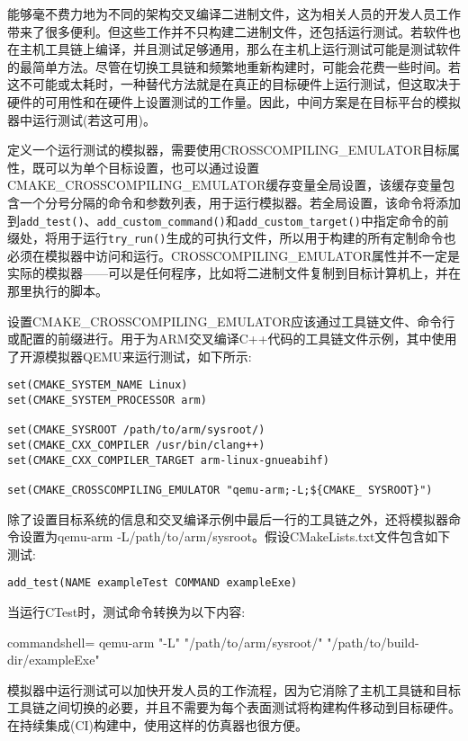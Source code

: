 
能够毫不费力地为不同的架构交叉编译二进制文件，这为相关人员的开发人员工作带来了很多便利。但这些工作并不只构建二进制文件，还包括运行测试。若软件也在主机工具链上编译，并且测试足够通用，那么在主机上运行测试可能是测试软件的最简单方法。尽管在切换工具链和频繁地重新构建时，可能会花费一些时间。若这不可能或太耗时，一种替代方法就是在真正的目标硬件上运行测试，但这取决于硬件的可用性和在硬件上设置测试的工作量。因此，中间方案是在目标平台的模拟器中运行测试(若这可用)。

定义一个运行测试的模拟器，需要使用CROSSCOMPILING\_EMULATOR目标属性，既可以为单个目标设置，也可以通过设置CMAKE\_CROSSCOMPILING\_EMULATOR缓存变量全局设置，该缓存变量包含一个分号分隔的命令和参数列表，用于运行模拟器。若全局设置，该命令将添加到\texttt{add\_test()}、\texttt{add\_custom\_command()}和\texttt{add\_custom\_target()}中指定命令的前缀处，将用于运行\texttt{try\_run()}生成的可执行文件，所以用于构建的所有定制命令也必须在模拟器中访问和运行。CROSSCOMPILING\_EMULATOR属性并不一定是实际的模拟器——可以是任何程序，比如将二进制文件复制到目标计算机上，并在那里执行的脚本。

设置CMAKE\_CROSSCOMPILING\_EMULATOR应该通过工具链文件、命令行或配置的前缀进行。用于为ARM交叉编译C++代码的工具链文件示例，其中使用了开源模拟器QEMU来运行测试，如下所示:

\begin{lstlisting}[style=styleCMake]
set(CMAKE_SYSTEM_NAME Linux)
set(CMAKE_SYSTEM_PROCESSOR arm)

set(CMAKE_SYSROOT /path/to/arm/sysroot/)
set(CMAKE_CXX_COMPILER /usr/bin/clang++)
set(CMAKE_CXX_COMPILER_TARGET arm-linux-gnueabihf)

set(CMAKE_CROSSCOMPILING_EMULATOR "qemu-arm;-L;${CMAKE_	SYSROOT}")
\end{lstlisting}

除了设置目标系统的信息和交叉编译示例中最后一行的工具链之外，还将模拟器命令设置为qemu-arm -L/path/to/arm/sysroot。假设CMakeLists.txt文件包含如下测试:

\begin{lstlisting}[style=styleCMake]
add_test(NAME exampleTest COMMAND exampleExe)
\end{lstlisting}

当运行CTest时，测试命令转换为以下内容:

\begin{tcblisting}{commandshell={}}
qemu-arm "-L" "/path/to/arm/sysroot/" "/path/to/build-dir/exampleExe"
\end{tcblisting}

模拟器中运行测试可以加快开发人员的工作流程，因为它消除了主机工具链和目标工具链之间切换的必要，并且不需要为每个表面测试将构建构件移动到目标硬件。在持续集成(CI)构建中，使用这样的仿真器也很方便。

